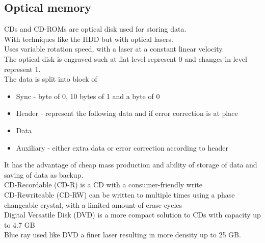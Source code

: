 \documentclass[12pt, a4paper]{article}
\begin{document}
		\subsection{Optical memory}
			CDs and CD-ROMs are optical disk used for storing data.\\
			With techniques like the HDD but with optical lasers.\\
			Uses variable rotation speed, with a laser at a constant linear velocity.\\
			The optical disk is engraved such at flat level represent 0 and changes in level represent 1.\\
			The data is split into block of
			\begin{itemize}
				\item Sync - byte of 0, 10 bytes of 1 and a byte of 0
				\item Header - represent the following data and if error correction is at place
				\item Data
				\item Auxiliary - either extra data or error correction according to header
			\end{itemize}
			It has the advantage of cheap mass production and ability of storage of data and saving of data as backup.\\
			CD-Recordable (CD-R) is a CD with a consumer-friendly write \\
			CD-Rewriteable (CD-RW) can be written to multiple times using a phase changeable crystal, with a limited amount of erase cycles\\
			Digital Versatile Disk (DVD) is a more compact solution to CDs with capacity up to 4.7 GB\\
			Blue ray used like DVD a finer laser resulting in more density up to 25 GB.
\end{document}
